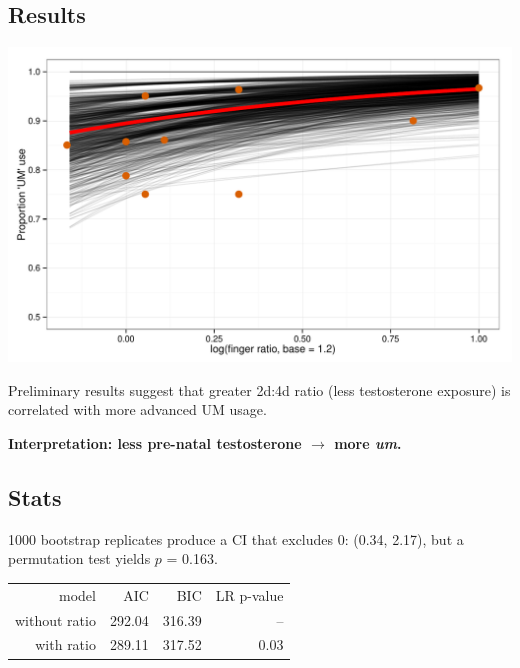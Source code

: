 \documentclass[a0,portrait]{a0poster}
\begin{document}
\begin{multicols}{2}


\section*{Results}

\begin{minipage}[c]{0.70\linewidth}
\includegraphics[width=1\linewidth]{finger_effect.pdf}
\end{minipage}
%
\begin{minipage}[c]{0.25\linewidth}
\large
Preliminary results suggest that greater 2d:4d ratio (less testosterone exposure) is correlated with more advanced UM usage.
\end{minipage}

\noindent\textbf{Interpretation: less pre-natal testosterone $\rightarrow$ more \textsl{um}.}

\subsection*{Stats}
1000 bootstrap replicates produce a CI that excludes 0: (0.34, 2.17), but a permutation test yields $p$ = 0.163.

\begin{center}
\begin{tabular}{rrrr}
\toprule
	model & AIC & BIC & LR p-value\\
	\cmidrule{2-4}
without ratio & 292.04 & 316.39 & -- \\
with ratio &  289.11 & 317.52 & 0.03\\
\bottomrule
\end{tabular}
\end{center}


\end{multicols}
\end{document}
